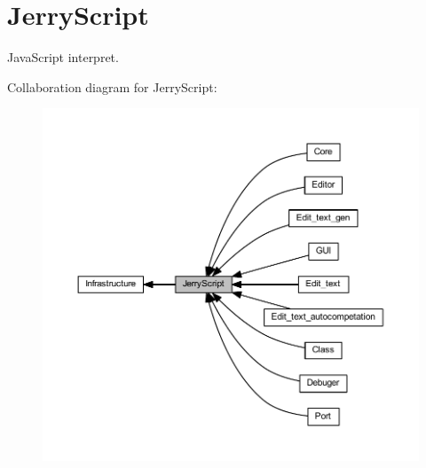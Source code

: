 \section{Jerry\+Script}
\label{group___jerry_script}


Java\+Script interpret.  


Collaboration diagram for Jerry\+Script\+:
\nopagebreak
\begin{figure}[H]
\begin{center}
\leavevmode
\includegraphics[width=350pt]{group___jerry_script}
\end{center}
\end{figure}
